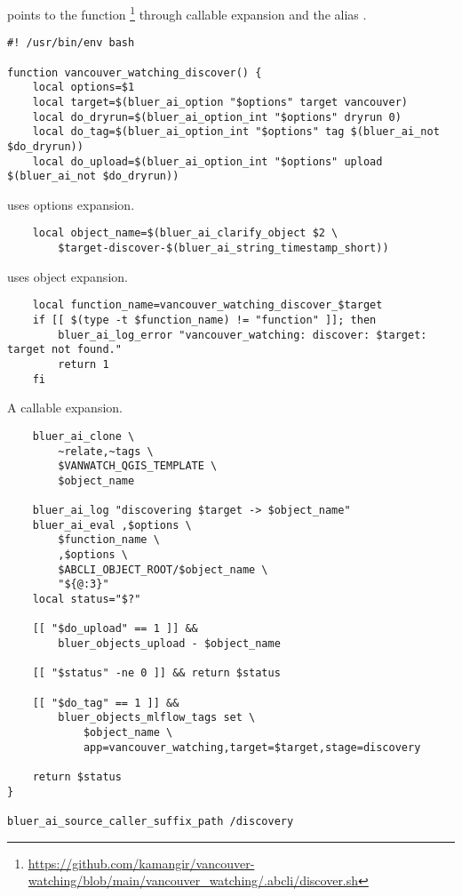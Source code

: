  points to the function \footnote{\url{https://github.com/kamangir/vancouver-watching/blob/main/vancouver_watching/.abcli/discover.sh}} through callable expansion and the alias .
%
\begin{graybox}
\begin{verbatim}
#! /usr/bin/env bash

function vancouver_watching_discover() {
    local options=$1
    local target=$(bluer_ai_option "$options" target vancouver)
    local do_dryrun=$(bluer_ai_option_int "$options" dryrun 0)
    local do_tag=$(bluer_ai_option_int "$options" tag $(bluer_ai_not $do_dryrun))
    local do_upload=$(bluer_ai_option_int "$options" upload $(bluer_ai_not $do_dryrun))
\end{verbatim}
\end{graybox}
%
 uses options expansion.
%
\begin{graybox}
\begin{verbatim}
    local object_name=$(bluer_ai_clarify_object $2 \
        $target-discover-$(bluer_ai_string_timestamp_short))
\end{verbatim}
\end{graybox}
%
 uses object expansion.
%
\begin{graybox}
\begin{verbatim}
    local function_name=vancouver_watching_discover_$target
    if [[ $(type -t $function_name) != "function" ]]; then
        bluer_ai_log_error "vancouver_watching: discover: $target: target not found."
        return 1
    fi
\end{verbatim}
\end{graybox}
%
A callable expansion.
%
\begin{graybox}
\begin{verbatim}
    bluer_ai_clone \
        ~relate,~tags \
        $VANWATCH_QGIS_TEMPLATE \
        $object_name

    bluer_ai_log "discovering $target -> $object_name"
    bluer_ai_eval ,$options \
        $function_name \
        ,$options \
        $ABCLI_OBJECT_ROOT/$object_name \
        "${@:3}"
    local status="$?"

    [[ "$do_upload" == 1 ]] &&
        bluer_objects_upload - $object_name

    [[ "$status" -ne 0 ]] && return $status

    [[ "$do_tag" == 1 ]] &&
        bluer_objects_mlflow_tags set \
            $object_name \
            app=vancouver_watching,target=$target,stage=discovery

    return $status
}

bluer_ai_source_caller_suffix_path /discovery
\end{verbatim}
\end{graybox}
